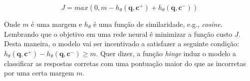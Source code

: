 \begin{equation}
J = max(0, m - h_{\theta}(\bm{q}, \bm{c^{+}}) + h_{\theta}(\bm{q}, \bm{c^{-}}))
\end{equation}

Onde $m$ é uma margem e $h_{\theta}$ é uma função de similaridade, e.g., \textit{cosine}. Lembrando que o objetivo em uma rede neural é minimizar a função custo $J$. Desta maneira, o modelo vai ser incentivado a satisfazer a seguinte condição: $h_{\theta}(\bm{q}, \bm{c^{+}}) - h_{\theta}(\bm{q}, \bm{c^{-}}) \geq m$. Quer dizer, a função \textit{hinge} induz o modelo a classificar as respostas corretas com uma pontuação maior do que as incorretas por uma certa margem $m$. 




